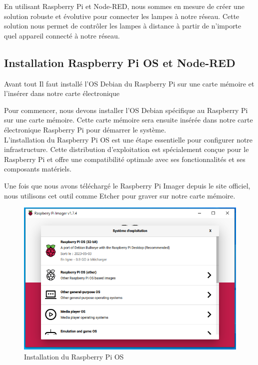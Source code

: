 En utilisant Raspberry Pi et Node-RED, nous sommes en mesure de créer une solution robuste et évolutive pour connecter les lampes à notre réseau. Cette solution nous permet de contrôler les lampes à distance à partir de n'importe quel appareil connecté à notre réseau. \\


\subsection{Installation Raspberry Pi OS et Node-RED}

Avant tout Il faut installé l'OS Debian du Raspberry Pi sur une carte mémoire et l'insérer dans notre carte électronique 



Pour commencer, nous devons installer l'OS Debian spécifique au Raspberry Pi sur une carte mémoire. Cette carte mémoire sera ensuite insérée dans notre carte électronique Raspberry Pi pour démarrer le système. \\

L'installation du Raspberry Pi OS est une étape essentielle pour configurer notre infrastructure. Cette distribution d'exploitation est spécialement conçue pour le Raspberry Pi et offre une compatibilité optimale avec ses fonctionnalités et ses composants matériels.


Une fois que nous avons téléchargé le Raspberry Pi Imager depuis le site officiel, nous utilisons cet outil comme Etcher pour graver sur notre carte mémoire. 


\begin{figure}[H]
 \centering
    \includegraphics[width=15cm]{Images/RaspberryPiOSInstall1.png}
    \caption{Installation du Raspberry Pi OS}
    \label{Chap4.3.1}
\end{figure}    
\smallskip


